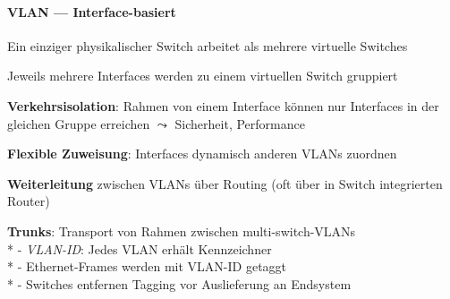 \paragraph{VLAN --- Interface-basiert}
\begin{items}
	\item Ein einziger physikalischer Switch arbeitet als mehrere virtuelle Switches
	\item Jeweils mehrere Interfaces werden zu einem virtuellen Switch gruppiert
	\smallskip
  \item \textbf{Verkehrsisolation}: Rahmen von einem Interface können nur Interfaces in der gleichen Gruppe erreichen \( \leadsto \) Sicherheit, Performance
  \item \textbf{Flexible Zuweisung}: Interfaces dynamisch anderen VLANs zuordnen
  \item \textbf{Weiterleitung} zwischen VLANs über Routing (oft über in Switch integrierten Router)
  \smallskip
  \item \textbf{Trunks}: Transport von Rahmen zwischen multi-switch-VLANs \\*
    - \emph{VLAN-ID}: Jedes VLAN erhält Kennzeichner \\*
    - Ethernet-Frames werden mit VLAN-ID getaggt \\*
    - Switches entfernen Tagging vor Auslieferung an Endsystem
\end{items}
